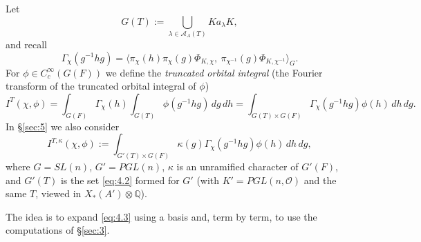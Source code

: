 \documentclass[12pt,letterpaper]{article}
\numberwithin{equation}{section}
\theoremstyle{plain}
\theoremstyle{remark}
\theoremstyle{plain}
\theoremstyle{definition}
\theoremstyle{remark}
\theoremstyle{remark}
\newcommand{\OO}{\mathcal{O}}
\newcommand{\cA}{\mathcal{A}}
\newcommand{\ip}[1]{\langle #1\rangle}
\begin{document}
Let
\setcounter{equation}{1}\begin{equation}\label{eq:4.2}
G(T):=\bigcup_{\lambda\in\cA_A(T)}Ka_\lambda K,
\end{equation}
and recall
\begin{equation}\label{eq:4.3}
\Gamma_\chi(g^{-1}hg)=\ip{\pi_\chi(h)\pi_\chi(g)\Phi_{K,\chi},\ \pi_{\chi^{-1}}(g)\Phi_{K,\chi^{-1}}}_G.
\end{equation}
For $\phi\in C_c^\infty(G(F))$ we define the \emph{truncated orbital integral} (the Fourier transform of the truncated orbital integral of $\phi$)
\begin{equation}\label{eq:4.4}
I^T(\chi,\phi)=\int_{G(F)}\Gamma_\chi(h)\int_{G(T)}\phi(g^{-1}hg)\,dg\,dh=\int_{G(T)\times G(F)}\Gamma_\chi(g^{-1}hg)\phi(h)\,dh\,dg.
\end{equation}
In \S\ref{sec:5} we also consider
\begin{equation}\label{eq:4.5}
I^{T,\kappa}(\chi,\phi):=\int_{G'(T)\times G(F)}\kappa(g)\Gamma_\chi(g^{-1}hg)\phi(h)\,dh\,dg,
\end{equation}
where $G=SL(n)$, $G'=PGL(n)$, $\kappa$ is an unramified character of $G'(F)$, and $G'(T)$ is the set \eqref{eq:4.2} formed for $G'$ (with $K'=PGL(n,\OO)$ and the same $T$, viewed in $X_*(A')\otimes\mathbb{Q}$).

The idea is to expand \eqref{eq:4.3} using a basis and, term by term, to use the computations of \S\ref{sec:3}.
\end{document}
